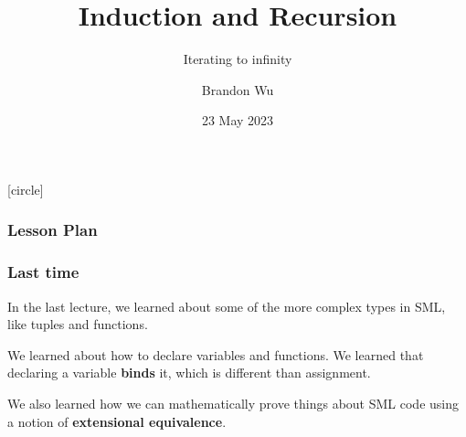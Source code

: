 \documentclass[aspectratio=169, handout]{beamer}
\title{Induction and Recursion} %
\subtitle{Iterating to infinity} %
\date{23 May 2023} %
\author{Brandon Wu} %
\newif\ifcolorlambda
\begin{document}
\ifweb
    \renewcommand{\pause}{}
\fi

[circle]

{
\begin{frame}[plain]
    \colorlambdatrue
    \titlepage
\end{frame}
}

\begin{frame}[fragile]
  \frametitle{Lesson Plan}

  \tableofcontents
\end{frame}

\begin{frame}[fragile]
  \frametitle{Last time}

  In the last lecture, we learned about some of the more complex types in
  SML, like tuples and functions.

  \vspace{\fill}

  We learned about how to declare variables and functions. We learned that declaring
  a variable \textbf{binds} it, which is different than assignment.

  \vspace{\fill}

  We also learned how we can mathematically prove things
  about SML code using a notion of \textbf{extensional equivalence}.
\end{frame}




\end{document}
